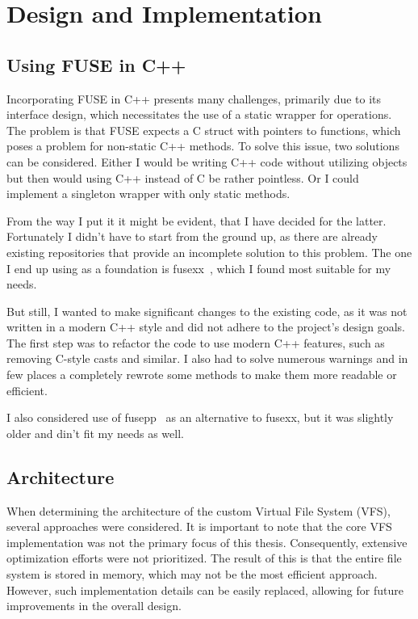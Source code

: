 \chapter{Design and Implementation}
\label{chap:design-and-architecture}

\section{Using FUSE in C++}\label{sec:fuse-in-cpp}

Incorporating FUSE in C++ presents many challenges, primarily due to its interface design, which necessitates the use of a static wrapper for operations.
The problem is that FUSE expects a C struct with pointers to functions, which poses a problem for non-static C++ methods.
To solve this issue, two solutions can be considered.
Either I would be writing C++ code without utilizing objects but then would using C++ instead of C be rather pointless.
Or I could implement a singleton wrapper with only static methods.

From the way I put it it might be evident, that I have decided for the latter.
Fortunately I didn't have to start from the ground up, as there are already existing repositories that provide an incomplete solution to this problem.
The one I end up using as a foundation is fusexx~\cite{fusexx}, which I found most suitable for my needs.

But still, I wanted to make significant changes to the existing code, as it was not written in a modern C++ style and did not adhere to the project's design goals.
The first step was to refactor the code to use modern C++ features, such as removing C-style casts and similar.
I also had to solve numerous warnings and in few places a completely rewrote some methods to make them more readable or efficient.

I also considered use of fusepp~\cite{fusepp} as an alternative to fusexx, but it was slightly older and din't fit my needs as well.

\section{Architecture}\label{sec:architecture}

When determining the architecture of the custom Virtual File System (VFS), several approaches were considered.
It is important to note that the core VFS implementation was not the primary focus of this thesis.
Consequently, extensive optimization efforts were not prioritized.
The result of this is that the entire file system is stored in memory, which may not be the most efficient approach.
However, such implementation details can be easily replaced, allowing for future improvements in the overall design.

